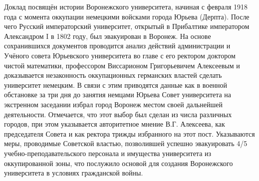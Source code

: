 


\vzmscaption


Доклад посвящён истории Воронежского университета,
начиная с февраля 1918 года с момента оккупации немецкими войсками города Юрьева (Дерпта).
После чего Русский императорский университет, открытый в Прибалтике императором Александром I в 1802 году,
был эвакуирован в Воронеж.
На основе сохранившихся документов проводится анализ действий администрации и Учёного совета Юрьевского университета во главе с его ректором доктором чистой математики, профессором Виссарионом Григорьевичем Алексеевым и доказывается незаконность оккупационных германских властей сделать университет немецким. В связи с этим приводятся данные как в военной обстановке за три дня до занятия немцами Юрьева Совет университета на экстренном заседании избрал город Воронеж местом своей дальнейшей деятельности. Отмечается, что этот выбор был сделан из числа различных городов, при этом указывается авторитетное мнение В.Г.  Алексеева, как председателя Совета и как ректора трижды избранного на этот пост. Указываются меры, проводимые Советской властью, позволившей успешно эвакуировать 4/5 учебно-преподавательского персонала и имущества университета из оккупированной зоны, что послужило основой для создания Воронежского университета в условиях гражданской войны.

\litlist

